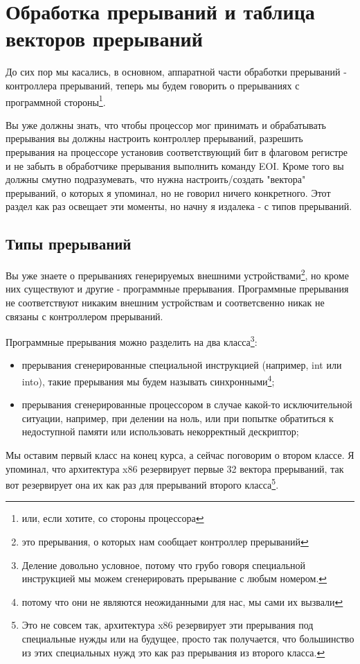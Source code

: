 \section{Обработка прерываний и таблица векторов прерываний}

До сих пор мы касались, в основном, аппаратной части обработки прерываний -
контроллера прерываний, теперь мы будем говорить о прерываниях с программной
стороны\footnote{или, если хотите, со стороны процессора}.

Вы уже должны знать, что чтобы процессор мог принимать и обрабатывать прерывания
вы должны настроить контроллер прерываний, разрешить прерывания на процессоре
установив соответствующий бит в флаговом регистре и не забыть в обработчике
прерывания выполнить команду EOI. Кроме того вы должны смутно подразумевать, что
нужна настроить/создать "вектора" прерываний, о которых я упоминал, но не
говорил ничего конкретного. Этот раздел как раз освещает эти моменты, но начну я
издалека - с типов прерываний.

\subsection{Типы прерываний}

Вы уже знаете о прерываниях генерируемых внешними устройствами\footnote{это
прерывания, о которых нам сообщает контроллер прерываний}, но кроме них
существуют и другие - программные прерывания. Программные прерывания не
соответствуют никаким внешним устройствам и соответсвенно никак не связаны с
контроллером прерываний.

Программные прерывания можно разделить на два класса\footnote{Деление довольно
условное, потому что грубо говоря специальной инструкцией мы можем сгенерировать
прерывание с любым номером.}:
\begin{itemize}
  \item прерывания сгенерированные специальной инструкцией (например, int или
        into), такие прерывания мы будем называть синхронными\footnote{потому
        что они не являются неожиданными для нас, мы сами их вызвали};
  \item прерывания сгенерированные процессором в случае какой-то исключительной
        ситуации, например, при делении на ноль, или при попытке обратиться к
        недоступной памяти или использовать некорректный дескриптор;
\end{itemize}

Мы оставим первый класс на конец курса, а сейчас поговорим о втором классе. Я
упоминал, что архитектура x86 резервирует первые 32 вектора прерываний, так вот
резервирует она их как раз для прерываний второго класса\footnote{Это не совсем
так, архитектура x86 резервирует эти прерывания под специальные нужды или на
будущее, просто так получается, что большинство из этих специальных нужд это
как раз прерывания из второго класса.}.

